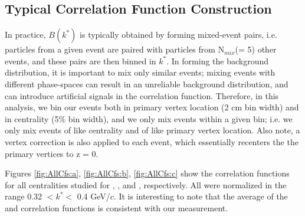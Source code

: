 \documentclass[/home/jesse/Analysis/FemtoAnalysis/AnalysisNotes/AnalysisNoteJBuxton.tex]{subfiles}
\begin{document}
\subsection{Typical Correlation Function Construction}
\label{TypicalCfConstruction}

In practice, $B(k^{*})$ is typically obtained by forming mixed-event pairs, i.e. particles from a given event are paired with particles from N$_{mix}$(= 5) other events, and these pairs are then binned in $k^{*}$.
In forming the background distribution, it is important to mix only similar events; mixing events with different phase-spaces can result in an unreliable background distribution, and can introduce artificial signals in the correlation function.
Therefore, in this analysis, we bin our events both in primary vertex location (2 cm bin width) and in centrality (5\% bin width), and we only mix events within a given bin; i.e. we only mix events of like centrality and of like primary vertex location.
Also note, a vertex correction is also applied to each event, which essentially recenters the the primary vertices to z = 0.

Figures \ref{fig:AllCfs:a}, \ref{fig:AllCfs:b}, \ref{fig:AllCfs:c} show the correlation functions for all centralities studied for \LamKchPALamKchM, \LamKchMALamKchP, and \LamALamKs, respectively. All were normalized in the range 0.32 $< k^{*} < $ 0.4 GeV/$c$.  It is interesting to note that the average of the \LamKchPALamKchM and \LamKchMALamKchP correlation functions is consistent with our \LamKsALamKs measurement. 

\end{document}
